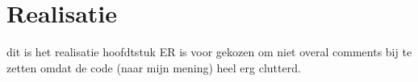 \chapter{Realisatie}
dit is het realisatie hoofdtstuk
ER is voor gekozen om niet overal comments bij te zetten omdat de code (naar mijn mening) heel erg clutterd.


